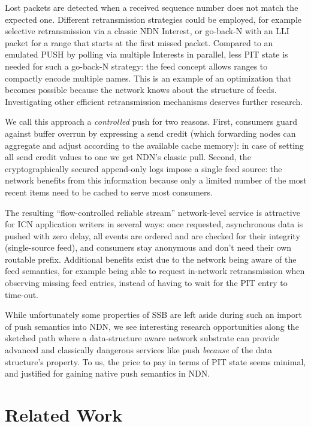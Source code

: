 \documentclass[9pt,sigconf]{acmart}
\begin{document}
Lost packets are detected when a received sequence number does not
match the expected one. Different retransmission strategies could be
employed, for example selective retransmission via a classic NDN
Interest, or go-back-N with an LLI packet for a range that starts at
the first missed packet. Compared to an emulated PUSH by polling via
multiple Interests in parallel, less PIT state is needed for such a
go-back-N strategy: the feed concept allows ranges to compactly encode
multiple names. This is an example of an optimization that becomes
possible because the network knows about the structure of
feeds. Investigating other efficient retransmission mechanisms
deserves further research.

We call this approach a \textit{controlled} push for two
reasons. First, consumers guard against buffer overrun by expressing a
send credit (which forwarding nodes can aggregate and adjust according
to the available cache memory): in case of setting all send credit
values to one we get NDN's classic pull. Second, the cryptographically
secured append-only logs impose a single feed source: the network
benefits from this information because only a limited number of the
most recent items need to be cached to serve most consumers.

The resulting ``flow-controlled reliable stream'' network-level
service is attractive for ICN application writers in several ways:
once requested, asynchronous data is pushed with zero delay, all
events are ordered and are checked for their integrity (single-source
feed), and consumers stay anonymous and don't need their own routable
prefix. Additional benefits exist due to the network being aware of
the feed semantics, for example being able to request in-network
retransmission when observing missing feed entries, instead of having
to wait for the PIT entry to time-out.

While unfortunately some properties of SSB are left aside during such
an import of push semantics into NDN, we see interesting research
opportunities along the sketched path where a data-structure aware
network substrate can provide advanced and classically dangerous
services like push {\em because} of the data structure's property. To
us, the price to pay in terms of PIT state seems minimal, and
justified for gaining native push semantics in NDN.



\section{Related Work}
\label{sect:relwork}
\end{document}
